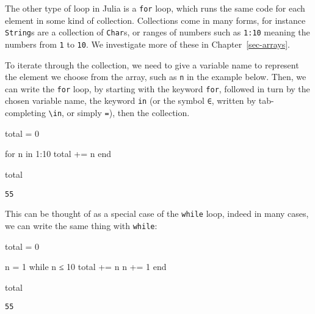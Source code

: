 \documentclass[
  letterpaper,
  DIV=11,
  numbers=noendperiod]{scrreprt}
\newenvironment{Shaded}{\begin{snugshade}}{\end{snugshade}}
\newcommand{\ControlFlowTok}[1]{\textcolor[rgb]{0.00,0.23,0.31}{#1}}
\newcommand{\FloatTok}[1]{\textcolor[rgb]{0.68,0.00,0.00}{#1}}
\newcommand{\KeywordTok}[1]{\textcolor[rgb]{0.00,0.23,0.31}{#1}}
\newcommand{\NormalTok}[1]{\textcolor[rgb]{0.00,0.23,0.31}{#1}}
\newcommand{\OperatorTok}[1]{\textcolor[rgb]{0.37,0.37,0.37}{#1}}
\begin{document}
The other type of loop in Julia is a \texttt{for} loop, which runs the
same code for each element in some kind of collection. Collections come
in many forms, for instance \texttt{String}s are a collection of
\texttt{Char}s, or ranges of numbers such as \texttt{1:10} meaning the
numbers from \texttt{1} to \texttt{10}. We investigate more of these in
Chapter~\ref{sec-arrays}.

To iterate through the collection, we need to give a variable name to
represent the element we choose from the array, such as \texttt{n} in
the example below. Then, we can write the \texttt{for} loop, by starting
with the keyword \texttt{for}, followed in turn by the chosen variable
name, the keyword \texttt{in} (or the symbol \texttt{∈}, written by
tab-completing \texttt{\textbackslash{}in}, or simply \texttt{=}), then
the collection.

\begin{Shaded}
\begin{Highlighting}[]
\NormalTok{total }\OperatorTok{=} \FloatTok{0}

\ControlFlowTok{for}\NormalTok{ n }\KeywordTok{in} \FloatTok{1}\OperatorTok{:}\FloatTok{10}
\NormalTok{    total }\OperatorTok{+=}\NormalTok{ n}
\ControlFlowTok{end}

\NormalTok{total}
\end{Highlighting}
\end{Shaded}

\begin{verbatim}
55
\end{verbatim}

This can be thought of as a special case of the \texttt{while} loop,
indeed in many cases, we can write the same thing with \texttt{while}:

\begin{Shaded}
\begin{Highlighting}[]
\NormalTok{total }\OperatorTok{=} \FloatTok{0}

\NormalTok{n }\OperatorTok{=} \FloatTok{1}
\ControlFlowTok{while}\NormalTok{ n }\OperatorTok{≤} \FloatTok{10}
\NormalTok{    total }\OperatorTok{+=}\NormalTok{ n}
\NormalTok{    n }\OperatorTok{+=} \FloatTok{1}
\ControlFlowTok{end}

\NormalTok{total}
\end{Highlighting}
\end{Shaded}

\begin{verbatim}
55
\end{verbatim}
\end{document}
